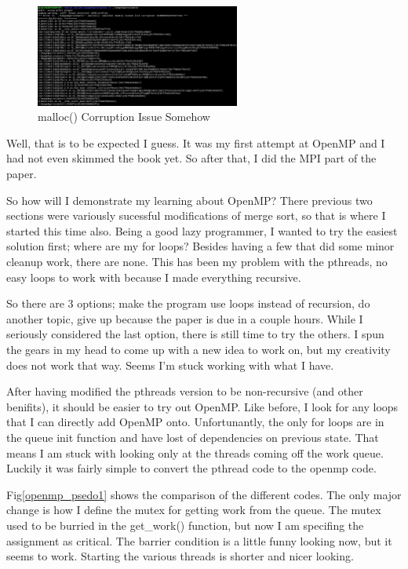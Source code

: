 \documentclass[12pt]{article}
\begin{document}
\begin{figure}[ht]
	\centering
	\includegraphics[width=0.6\textwidth]{openMP_for_image_approximator.png}
	\caption{malloc() Corruption Issue Somehow}
	\label{openmp_fail1}
\end{figure}

Well, that is to be expected I guess. It was my first attempt at OpenMP and I had not even skimmed the book yet.
So after that, I did the MPI part of the paper.

So how will I demonstrate my learning about OpenMP?
There previous two sections were variously sucessful modifications of merge sort, so that is where I started this time also.
Being a good lazy programmer, I wanted to try the easiest solution first; where are my for loops?
Besides having a few that did some minor cleanup work, there are none.
This has been my problem with the pthreads, no easy loops to work with because I made everything recursive.

So there are 3 options; make the program use loops instead of recursion, do another topic, give up because the paper is due in a couple hours.
While I seriously considered the last option, there is still time to try the others.
I spun the gears in my head to come up with a new idea to work on, but my creativity does not work that way.
Seems I'm stuck working with what I have.


After having modified the pthreads version to be non-recursive (and other benifits), it should be easier to try out OpenMP.
Like before, I look for any loops that I can directly add OpenMP onto.
Unfortunantly, the only for loops are in the queue init function and have lost of dependencies on previous state.
That means I am stuck with looking only at the threads coming off the work queue.
Luckily it was fairly simple to convert the pthread code to the openmp code.

Fig\ref{openmp_psedo1} shows the comparison of the different codes.
The only major change is how I define the mutex for getting work from the queue.
The mutex used to be burried in the get\_work() function, but now I am specifing the assignment as critical.
The barrier condition is a little funny looking now, but it seems to work.
Starting the various threads is shorter and nicer looking.
\end{document}
